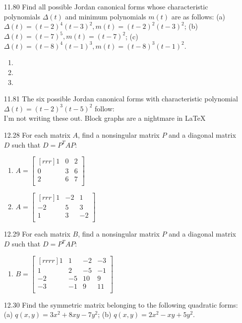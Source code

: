 \documentclass[12pt]{article}
\theoremstyle{definition}
\theoremstyle{plain}
\begin{document}
\begin{enumerate}
\item[11.80]Find all possible Jordan canonical forms whose characteristic polynomials $\Delta (t)$ and minimum polynomials $m(t)$ are as follows: (a) $\Delta (t)=(t-2)^4(t-3)^2,m(t)=(t-2)^2(t-3)^2$; (b) $\Delta (t)=(t-7)^5,m(t)=(t-7)^2$; (c) $\Delta (t) =(t-8)^4(t-1)^3,m(t)=(t-8)^3(t-1)^2$.
	\begin{enumerate}
	\item
	\item
	\item
	\end{enumerate}		
\item[11.81]The six possible Jordan canonical forms with characteristic polynomial $\Delta (t)=(t-2)^3(t-5)^2$ follow:\\
I'm not writing these out. Block graphs are a nightmare in \LaTeX
\item[12.28]For each matrix $A$, find a nonsingular matrix $P$ and a diagonal matrix $D$ such that $D=P^TAP$:
	\begin{enumerate}
	\item $A=\begin{bmatrix}[rrr]1&0&2\\0&3&6\\2&6&7\\\end{bmatrix}$
	\item $A=\begin{bmatrix}[rrr]1&-2&1\\-2&5&3\\1&3&-2\\\end{bmatrix}$
	\end{enumerate}		
\item[12.29]For each matrix $B$, find a nonsingular matrix $P$ and a diagonal matrix $D$ such that $D=P^TAP$:
	\begin{enumerate}
	\item $B=\begin{bmatrix}[rrrr]1&1&-2&-3\\1&2&-5&-1\\-2&-5&10&9\\-3&-1&9&11\\\end{bmatrix}$
	\end{enumerate}		
\item[12.30]Find the symmetric matrix belonging to the following quadratic forms: (a) $q(x,y)=3x^2+8xy-7y^2$; (b) $q(x,y)=2x^2-xy+5y^2$.
	\begin{enumerate}

\end{enumerate}
\end{enumerate}
\end{document}
